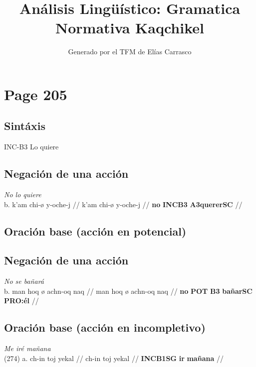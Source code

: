 \documentclass{article}%
\title{Análisis Lingüístico: Gramatica Normativa Kaqchikel}%
\author{Generado por el TFM de Elías Carrasco}%
\begin{document}
%
\normalsize%
\maketitle%
\section{Page 205}%
\label{sec:Page205}%
\subsection{Sintáxis}%
\label{subsec:Sintxis}%

%
INC{-}B3 %
Lo quiere %
\subsection{Negación de una acción}%
\label{subsec:Negacindeunaaccin}%

%
\par\medskip%
\ex
\textit{No lo quiere} \\
\begingl
\gla b. k'am chi-ø y-oche-j //
\glb k'am chi-ø y-oche-j //
\glc \textbf{no} \textbf{INC}\textbf{B3} \textbf{A3}\textbf{querer}\textbf{SC} //
\endgl
\xe
%
\medskip%
\subsection{Oración base (acción en potencial)}%
\label{subsec:Oracinbase(accinenpotencial)}%

%
\subsection{Negación de una acción}%
\label{subsec:Negacindeunaaccin}%

%
\par\medskip%
\ex
\textit{No se bañará} \\
\begingl
\gla b. man hoq ø achn-oq naq //
\glb man hoq ø achn-oq naq //
\glc \textbf{no} \textbf{POT} \textbf{B3} \textbf{bañar}\textbf{SC} \textbf{PRO:él} //
\endgl
\xe
%
\medskip%
\subsection{Oración base (acción en incompletivo)}%
\label{subsec:Oracinbase(accinenincompletivo)}%

%
\par\medskip%
\ex
\textit{Me iré mañana} \\
\begingl
\gla (274) a. ch-in toj yekal //
\glb ch-in toj yekal //
\glc \textbf{INC}\textbf{B1SG} \textbf{ir} \textbf{mañana} //
\endgl
\xe
%
\medskip%
\end{document}
